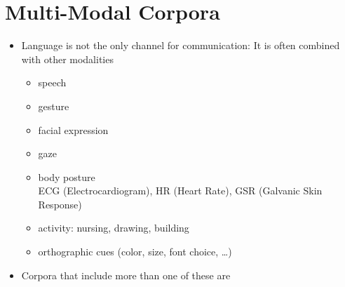 \documentclass[a4paper,landscape,headrule,footrule,xetex]{foils}
\begin{document}



\section{Multi-Modal Corpora}


\begin{itemize}
\item Language is not the only channel for communication: It is often
  combined with other modalities
  \begin{itemize}
  \item speech
  \item gesture
  \item facial expression
  \item gaze
  \item body posture
\\ ECG (Electrocardiogram), HR (Heart Rate), GSR (Galvanic Skin Response)
  \item activity: nursing, drawing, building
  \item orthographic cues (color, size, font choice, \ldots)
  \end{itemize}
\item Corpora that include more than one of these are 
\end{itemize}
\end{document}
